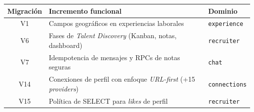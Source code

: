 \vspace{0.2cm}
\noindent
\renewcommand{\arraystretch}{1.35}
\fontsize{9}{10.8}\selectfont\sffamily
\begin{tabularx}{\textwidth}{|c|X|l|}
\hline
\rowcolor{headerTabla}
\textbf{Migración} & \textbf{Incremento funcional} & \textbf{Dominio} \\
\hline
V1 & Campos geográficos en experiencias laborales & \texttt{experience} \\
\hline
\rowcolor{grisTecnico}
V6 & Fases de \textit{Talent Discovery} (Kanban, notas, dashboard) & \texttt{recruiter} \\
\hline
V7 & Idempotencia de mensajes y RPCs de notas seguras & \texttt{chat} \\
\hline
\rowcolor{grisTecnico}
V14 & Conexiones de perfil con enfoque \textit{URL-first} (+15 \textit{providers}) & \texttt{connections} \\
\hline
V15 & Política de SELECT para \textit{likes} de perfil & \texttt{recruiter} \\
\hline
\end{tabularx}
\label{tab:migraciones-trazabilidad}
